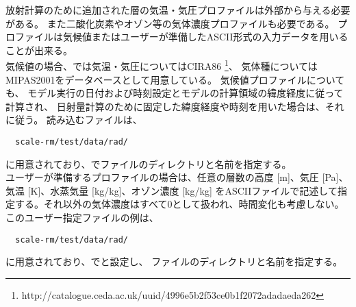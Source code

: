 放射計算のために追加された層の気温・気圧プロファイルは外部から与える必要がある。
また二酸化炭素やオゾン等の気体濃度プロファイルも必要である。
プロファイルは気候値またはユーザーが準備したASCII形式の入力データを用いることが出来る。\\
気候値の場合、\scalerm では気温・気圧についてはCIRA86
\footnote{http://catalogue.ceda.ac.uk/uuid/4996e5b2f53ce0b1f2072adadaeda262}\citep{CSR_2006}、
気体種についてはMIPAS2001\citep{Remedios_2007}をデータベースとして用意している。
気候値プロファイルについても、
モデル実行の日付および時刻設定とモデルの計算領域の緯度経度に従って計算され、
日射量計算のために固定した緯度経度や時刻を用いた場合は、それに従う。
読み込むファイルは、
\begin{verbatim}
  scale-rm/test/data/rad/
\end{verbatim}
に用意されており、でファイルのディレクトリと名前を指定する。\\

ユーザーが準備するプロファイルの場合は、任意の層数の高度 [m]、気圧 [Pa]、気温 [K]、水蒸気量 [kg/kg]、オゾン濃度 [kg/kg]
をASCIIファイルで記述して指定する。それ以外の気体濃度はすべて0として扱われ、時間変化も考慮しない。
このユーザー指定ファイルの例は、
\begin{verbatim}
  scale-rm/test/data/rad/
\end{verbatim}
に用意されており、でと設定し、
ファイルのディレクトリと名前を指定する。\\

